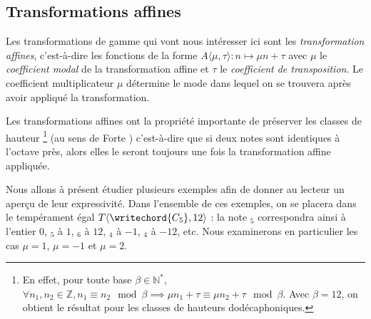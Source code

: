 \subsection{Transformations affines}

Les transformations de gamme qui vont nous intéresser ici sont les \emph{transformation affines}, c'est-à-dire les fonctions de la forme $A\langle\mu,\tau\rangle : n \mapsto \mu n + \tau$ avec $\mu$ le \emph{coefficient modal} de la transformation affine et $\tau$ le \emph{coefficient de transposition}. Le coefficient multiplicateur $\mu$ détermine le mode dans lequel on se trouvera après avoir appliqué la transformation. 

Les transformations affines ont la propriété importante de préserver les classes de hauteur \footnote{En effet, pour toute base $\beta\in \mathbb{N}^*$, $\forall n_1,n_2 \in \mathbb{Z}, n_1 \equiv n_2 \mod \beta \implies \mu n_1 + \tau \equiv \mu n_2 + \tau \mod \beta$. Avec $\beta=12$, on obtient le résultat pour les classes de hauteurs dodécaphoniques. }  (au sens de Forte \cite{forte1973structure}) c'est-à-dire que si deux notes sont identiques à l'octave près, alors elles le seront toujours une fois la transformation affine appliquée. 

Nous allons à présent étudier plusieurs exemples afin de donner au lecteur un aperçu de leur expressivité. Dans l'ensemble de ces exemples, on se placera dans le tempérament égal $T\langle \writechord{C_5},12\rangle$ : la note $_5$ correspondra ainsi à l'entier $0$, $_5$ à $1$, $_6$ à $12$, $_4$ à $-1$, $_4$ à $-12$, etc. Nous examinerons en particulier les cas $\mu = 1$, $\mu = -1$ et $\mu = 2$.